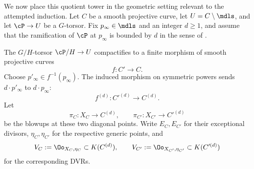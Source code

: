 We now place this quotient tower in the geometric setting relevant to the
attempted induction.
Let $C$ be a smooth projective curve, let $U=C\setminus\mdls$, and let
$\cP\to U$ be a $G$-torsor. Fix $p_\infty\in\mdls$ and an integer $d\geq1$,
and assume that the ramification of $\cP$ at $p_\infty$ is bounded by $d$ in
the sense of .

The $G/H$-torsor $\cP/H\to U$ compactifies to a finite morphism of smooth
projective curves
\[
f:C'\longrightarrow C.
\]
Choose $p'_\infty\in f^{-1}(p_\infty)$. The induced morphism on symmetric
powers sends $d\cdot p'_\infty$ to $d\cdot p_\infty$:
\[
f^{(d)}:C'^{(d)}\longrightarrow C^{(d)}.
\]
Let
\[
\pi_C:X_C\longrightarrow C^{(d)},\qquad
\pi_{C'}:X_{C'}\longrightarrow C'^{(d)}
\]
be the blowups at these two diagonal points. Write $E_C,E_{C'}$ for their
exceptional divisors, $\eta_C,\eta_{C'}$ for the respective generic points,
and
\[
V_C:=\Oo_{X_C,\eta_C}\subset K(C^{(d)}),\qquad
V_{C'}:=\Oo_{X_{C'},\eta_{C'}}\subset K(C'^{(d)})
\]
for the corresponding DVRs.

